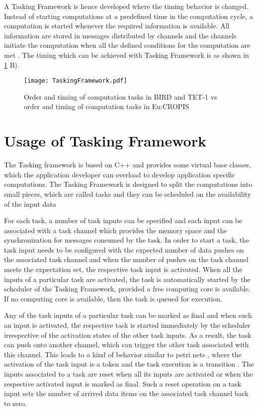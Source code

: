 A Tasking Framework is hence developed where the timing behavior is changed. Instead of starting computations at a predefined time in the computation cycle, a computation is started whenever the required information is available. All information are stored in messages distributed by channels and the channels initiate the computation when all the defined conditions for the computation are met \cite{TETBIRD}\cite{TETtoEUCROPIS}. The timing which can be achieved with Tasking Framework is as shown in \cref{fig: Tasking} B).    

\begin{figure}[h]
	\centering
	\texttt{[image: TaskingFramework.pdf]}
	\caption{Order and timing of computation tasks in BIRD and TET-1 vs order and timing of computation tasks in Eu:CROPIS}
	\label{fig: Tasking}
\end{figure}

\section{Usage of Tasking Framework}
The Tasking framework is based on C++ and provides some virtual base classes, which the application developer can overload to develop application specific computations. The Tasking Framework is designed to split the computations into small pieces, which are called tasks and they can be scheduled on the availability of the input data

For each task, a number of task inputs can be specified and each input can be associated with a task channel which provides the memory space and the synchronization for messages consumed by the task. In order to start a task, the task input needs to be configured with the expected number of data pushes on the associated task channel and when the number of pushes on the task channel meets the expectation set, the respective task input is activated. When all the inputs of a particular task are activated, the task is automatically started by the scheduler of the Tasking Framework, provided a free computing core is available. If no computing core is available, then the task is queued for execution.

Any of the task inputs of a particular task can be marked as final and when such an input is activated, the respective task is started immediately by the scheduler irrespective of the activation states of the other task inputs. As a result, the task can push onto another channel, which can trigger the other task associated with this channel. This leads to a kind of behavior similar to petri nets \cite{Petrinet}, where the activation of the task input is a token and the task execution is a transition \cite{TaskFr}. The inputs associated to a task are reset when all its inputs are activated or when the respective activated input is marked as final. Such a reset operation on a task input sets the number of arrived data items on the associated task channel back to zero.

